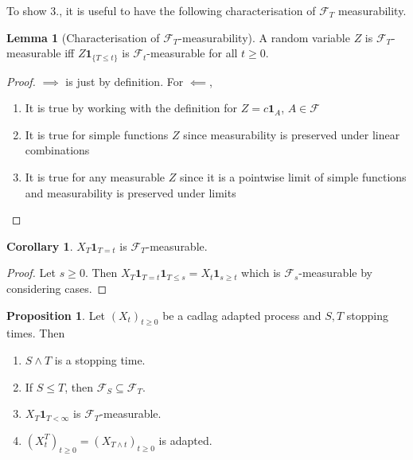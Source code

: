 \documentclass[parskip=full]{article}
\theoremstyle{definition}
\newtheorem{corollary}{Corollary}
\newtheorem{proposition}{Proposition}[section]
\newtheorem{lemma}{Lemma}[proposition]
\newcommand{\1}{\mathbbm{1}}
\begin{document}
To show 3., it is useful to have the following characterisation of $\mathcal{F}_T$ measurability.

\begin{lemma}[Characterisation of $\mathcal{F}_T$-measurability] \label{Characterisation of F_T measurability}
  A random variable $Z$ is $\mathcal{F}_T$-measurable iff $Z \mathbf{1}_{\{T \leq t\}}$ is $\mathcal{F}_t$-measurable for all $t \geq 0$.
\end{lemma}

\begin{proof}
  $\implies$ is just by definition. For $\impliedby$,
  \begin{enumerate}
    \item It is true by working with the definition for $Z=c \mathbf{1}_A$, $A \in \mathcal{F}$
    \item It is true for simple functions $Z$ since measurability is preserved under linear combinations
    \item It is true for any measurable $Z$ since it is a pointwise limit of simple functions and measurability is preserved under limits
  \end{enumerate}
\end{proof}

\begin{corollary}\label{Martingale at a particular time is F_T measurable}
  $X_T \mathbf{1}_{T =t}$ is $\mathcal{F}_T$-measurable.
\end{corollary}

\begin{proof}
  Let $s \geq 0$. Then $X_T \mathbf{1}_{T =t} \mathbf{1}_{T \leq s} = X_t \mathbf{1}_{s \geq t}$ which is $\mathcal{F}_s$-measurable by considering cases.
\end{proof}

\begin{proposition}
  Let $(X_t)_{t \geq 0}$ be a cadlag adapted process and $S, T$ stopping times. Then
  \begin{enumerate}
    \item $S \wedge T$ is a stopping time.
    \item If $S \leq T$, then $\mathcal{F}_S \subseteq \mathcal{F}_T$.
    \item $X_T \mathbf{1}_{T < \infty}$ is $\mathcal{F}_T$-measurable.
    \item $(X_t^T)_{t \geq 0} = (X_{T \wedge t})_{t \geq 0}$ is adapted.
  \end{enumerate}
\end{proposition}
\end{document}
